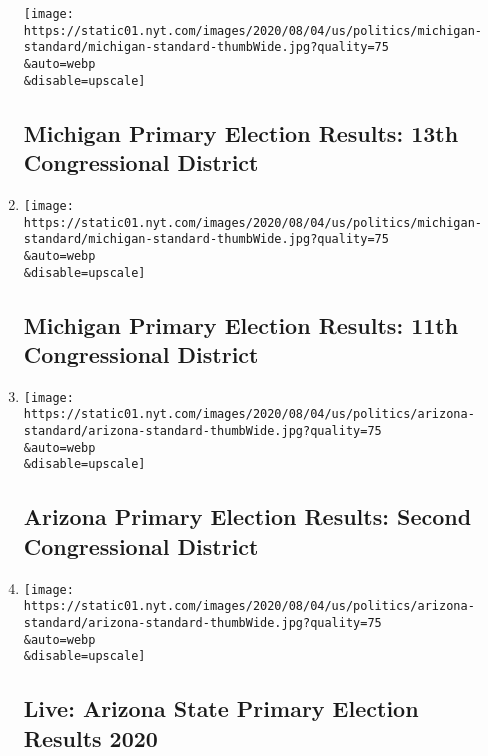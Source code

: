 \begin{enumerate}
  \texttt{[image: https://static01.nyt.com/images/2020/08/04/us/politics/michigan-standard/michigan-standard-thumbWide.jpg?quality=75\\\&auto=webp\\\&disable=upscale]}

  \hypertarget{michigan-primary-election-results-13th-congressional-district}{%
  \subsection{Michigan Primary Election Results: 13th Congressional
  District}\label{michigan-primary-election-results-13th-congressional-district}}
\item
  \href{/interactive/2020/08/04/us/elections/results-michigan-house-district-11-primary-election.html}{}

  \texttt{[image: https://static01.nyt.com/images/2020/08/04/us/politics/michigan-standard/michigan-standard-thumbWide.jpg?quality=75\\\&auto=webp\\\&disable=upscale]}

  \hypertarget{michigan-primary-election-results-11th-congressional-district}{%
  \subsection{Michigan Primary Election Results: 11th Congressional
  District}\label{michigan-primary-election-results-11th-congressional-district}}
\item
  \href{/interactive/2020/08/04/us/elections/results-arizona-house-district-2-primary-election.html}{}

  \texttt{[image: https://static01.nyt.com/images/2020/08/04/us/politics/arizona-standard/arizona-standard-thumbWide.jpg?quality=75\\\&auto=webp\\\&disable=upscale]}

  \hypertarget{arizona-primary-election-results-second-congressional-district}{%
  \subsection{Arizona Primary Election Results: Second Congressional
  District}\label{arizona-primary-election-results-second-congressional-district}}
\item
  \href{/interactive/2020/08/04/us/elections/results-arizona-primary-elections.html}{}

  \texttt{[image: https://static01.nyt.com/images/2020/08/04/us/politics/arizona-standard/arizona-standard-thumbWide.jpg?quality=75\\\&auto=webp\\\&disable=upscale]}

  \hypertarget{live-arizona-state-primary-election-results-2020}{%
  \subsection{Live: Arizona State Primary Election Results
  2020}\label{live-arizona-state-primary-election-results-2020}}
\end{enumerate}

